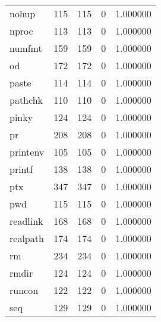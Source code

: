\begin{longtable}{lrrrr}
nohup     &                     115 &              115 &                 0 &                     1.000000 \\
nproc     &                     113 &              113 &                 0 &                     1.000000 \\
numfmt    &                     159 &              159 &                 0 &                     1.000000 \\
od        &                     172 &              172 &                 0 &                     1.000000 \\
paste     &                     114 &              114 &                 0 &                     1.000000 \\
pathchk   &                     110 &              110 &                 0 &                     1.000000 \\
pinky     &                     124 &              124 &                 0 &                     1.000000 \\
pr        &                     208 &              208 &                 0 &                     1.000000 \\
printenv  &                     105 &              105 &                 0 &                     1.000000 \\
printf    &                     138 &              138 &                 0 &                     1.000000 \\
ptx       &                     347 &              347 &                 0 &                     1.000000 \\
pwd       &                     115 &              115 &                 0 &                     1.000000 \\
readlink  &                     168 &              168 &                 0 &                     1.000000 \\
realpath  &                     174 &              174 &                 0 &                     1.000000 \\
rm        &                     234 &              234 &                 0 &                     1.000000 \\
rmdir     &                     124 &              124 &                 0 &                     1.000000 \\
runcon    &                     122 &              122 &                 0 &                     1.000000 \\
seq       &                     129 &              129 &                 0 &                     1.000000 \\

\end{longtable}
